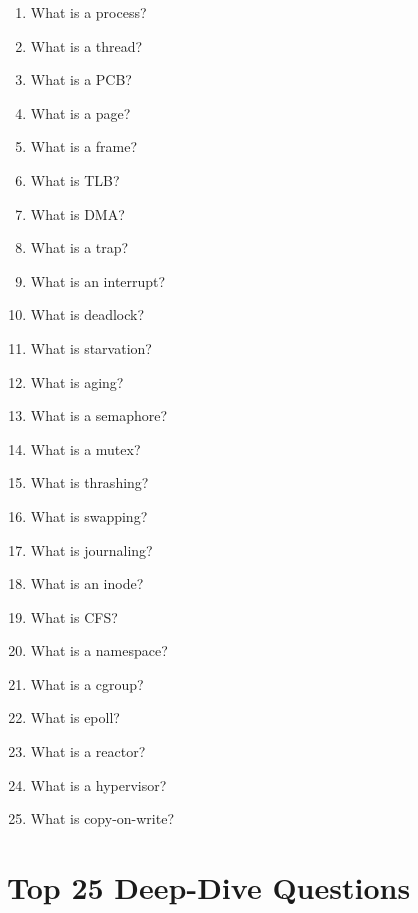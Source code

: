 \begin{enumerate}
\item What is a process?
\item What is a thread?
\item What is a PCB?
\item What is a page?
\item What is a frame?
\item What is TLB?
\item What is DMA?
\item What is a trap?
\item What is an interrupt?
\item What is deadlock?
\item What is starvation?
\item What is aging?
\item What is a semaphore?
\item What is a mutex?
\item What is thrashing?
\item What is swapping?
\item What is journaling?
\item What is an inode?
\item What is CFS?
\item What is a namespace?
\item What is a cgroup?
\item What is epoll?
\item What is a reactor?
\item What is a hypervisor?
\item What is copy-on-write?
\end{enumerate}

\section{Top 25 Deep-Dive Questions}

